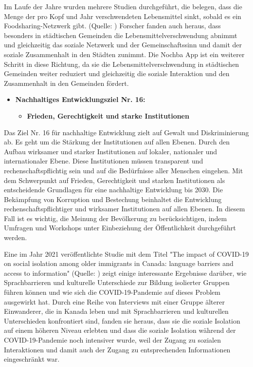 Im Laufe der Jahre wurden mehrere Studien durchgeführt, die belegen, dass die Menge der pro Kopf und Jahr verschwendeten Lebensmittel sinkt, sobald es ein Foodsharing-Netzwerk gibt. (Quelle: \cite{parizeau2015food} ) Forscher fanden auch heraus, dass besonders in städtischen Gemeinden die Lebensmittelverschwendung abnimmt und gleichzeitig das soziale Netzwerk und der Gemeinschaftssinn und damit der soziale Zusammenhalt in den Städten zunimmt.  Die Nochba App ist ein weiterer Schritt in diese Richtung, da sie die Lebensmittelverschwendung in städtischen Gemeinden weiter reduziert und gleichzeitig die soziale Interaktion und den Zusammenhalt in den Gemeinden fördert.

\begin{itemize}
    \item \textbf{Nachhaltiges Entwicklungsziel Nr. 16: }
    \begin{itemize}
        \item \textbf{Frieden, Gerechtigkeit und starke Institutionen}
    \end{itemize}
\end{itemize}

Das Ziel Nr. 16 für nachhaltige Entwicklung zielt auf Gewalt und Diskriminierung ab. Es geht um die Stärkung der Institutionen auf allen Ebenen. Durch den Aufbau wirksamer und starker Institutionen auf lokaler, nationaler und internationaler Ebene. Diese Institutionen müssen transparent und rechenschaftspflichtig sein und auf die Bedürfnisse aller Menschen eingehen. Mit dem Schwerpunkt auf Frieden, Gerechtigkeit und starken Institutionen als entscheidende Grundlagen für eine nachhaltige Entwicklung bis 2030. Die Bekämpfung von Korruption und Bestechung beinhaltet die Entwicklung rechenschaftspflichtiger und wirksamer Institutionen auf allen Ebenen. In diesem Fall ist es wichtig, die Meinung der Bevölkerung zu berücksichtigen, indem Umfragen und Workshops unter Einbeziehung der Öffentlichkeit durchgeführt werden. 

Eine im Jahr 2021 veröffentlichte Studie mit dem Titel "The impact of COVID-19 on social isolation among older immigrants in Canada: language barriers and access to information" (Quelle: ) zeigt einige interessante Ergebnisse darüber, wie Sprachbarrieren und kulturelle Unterschiede zur Bildung isolierter Gruppen führen können und wie sich die COVID-19-Pandemie auf dieses Problem ausgewirkt hat. Durch eine Reihe von Interviews mit einer Gruppe älterer Einwanderer, die in Kanada leben und mit Sprachbarrieren und kulturellen Unterschieden konfrontiert sind, fanden sie heraus, dass sie die soziale Isolation auf einem höheren Niveau erlebten und dass die soziale Isolation während der COVID-19-Pandemie noch intensiver wurde, weil der Zugang zu sozialen Interaktionen und damit auch der Zugang zu entsprechenden Informationen eingeschränkt war.

